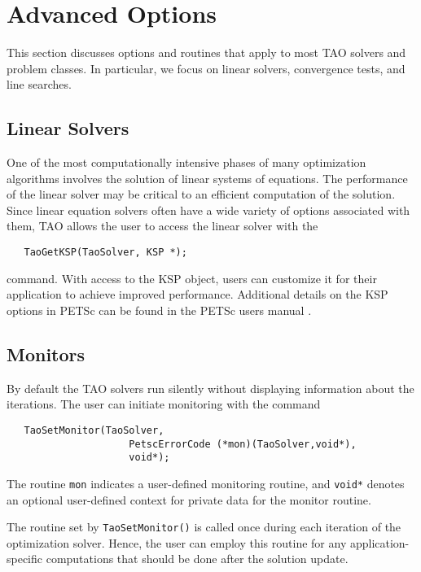 
\chapter{Advanced Options}

This section discusses options and routines that apply to most TAO
solvers and problem classes.  In particular, we focus on
linear solvers, convergence tests, and line searches.

\section{Linear Solvers}\label{sec:TaoLinearSolvers}
One of the most computationally intensive phases of many optimization
algorithms involves the solution of linear systems of equations.  
The performance of the linear solver may be critical to an efficient 
computation of the solution.  Since linear equation solvers often have 
a wide variety of options associated with them, TAO allows the user to 
access the linear solver with the
\begin{verbatim}
   TaoGetKSP(TaoSolver, KSP *);
\end{verbatim}
command. 
With access to the KSP object, users can customize it for their application
to achieve improved performance. Additional details on the KSP options in
PETSc can be found in the PETSc users manual \cite{petsc-user-ref}.



\section{Monitors}
By default the TAO solvers run silently without displaying information
about the iterations. The user can initiate monitoring with the
command  
\begin{verbatim}
   TaoSetMonitor(TaoSolver,
                     PetscErrorCode (*mon)(TaoSolver,void*),
                     void*);
\end{verbatim}
\noindent
The routine {\tt mon} indicates a user-defined monitoring routine,
and {\tt void*} denotes an optional user-defined context for private 
data for the monitor routine.

The routine set by {\tt TaoSetMonitor()} is called once during each
iteration of the optimization solver.  Hence, the user can employ this 
routine for any application-specific computations that should be done 
after the solution update. 





